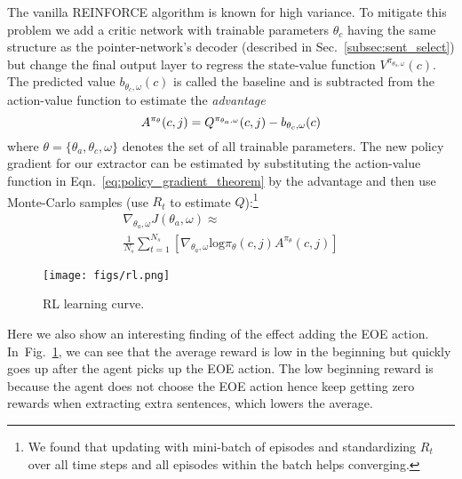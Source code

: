 \documentclass[11pt,a4paper]{article}
\def\figref#1{Fig.~\ref{#1}}
\def\secref#1{Sec.~\ref{#1}}
\def\eqnref#1{Eqn.~\ref{#1}}
\begin{document}
The vanilla REINFORCE algorithm is known for high variance. 
To mitigate this problem we add a critic network with trainable parameters $\theta_c$ having the same structure as the pointer-network's decoder (described in \secref{subsec:sent_select}) but change the final output layer to regress the state-value function $V^{\pi_{\theta_a, \omega}}(c)$.
The predicted value $b_{\theta_c, \omega}(c)$ is called the baseline and is subtracted from the action-value function to estimate the \textit{advantage}
$$ 
A^{\pi_\theta}(c, j) = Q^{\pi_{\theta_a, \omega}}(c, j) - b_{\theta_c, \omega}(c)\\
$$ 
where $\theta = \{\theta_a, \theta_c, \omega\}$
denotes the set of all trainable parameters.
The new policy gradient for our extractor can be estimated by substituting the action-value function in \eqnref{eq:policy_gradient_theorem} by the advantage and then use Monte-Carlo samples (use $R_t$ to estimate $Q$):\footnote{We found that updating with mini-batch of episodes and standardizing 
$R_t$ over all time steps and all episodes within the batch helps converging.
}
\begin{equation}
\begin{split}
\nabla_{\theta_a, \omega} J(\theta_a, \omega) \approx \\
\frac{1}{N_s} \sum_{t=1}^{N_s}
[\nabla_{\theta_a, \omega}\text{log}\pi_\theta(c, j) A^{\pi_{\theta}}(c, j)]
\end{split}
\end{equation}

\begin{figure}
\texttt{[image: figs/rl.png]}
\vspace{-20pt}
\caption{RL learning curve.}
\label{fig:rl_curve}
\vspace{-10pt}
\end{figure}

Here we also show an interesting finding of the effect adding the EOE action.
In~\figref{fig:rl_curve}, we can see that the average reward is low in the beginning but quickly goes up after the agent picks up the EOE action.
The low beginning reward is because the agent does not choose the EOE action hence keep getting zero rewards when extracting extra sentences, which lowers the average.
\end{document}
